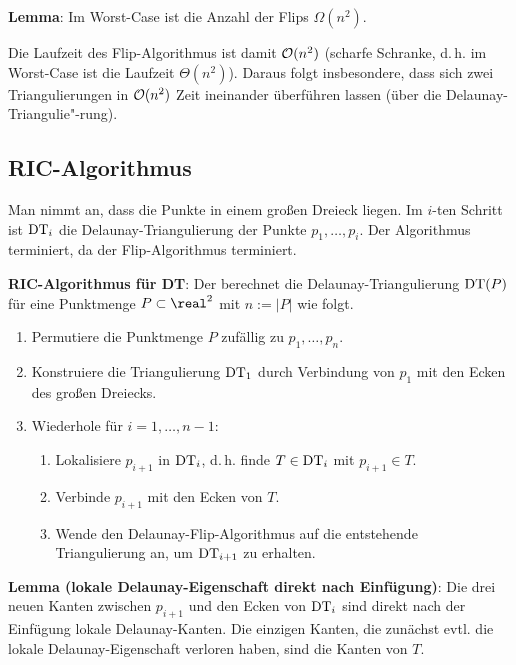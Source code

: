 \textbf{Lemma}:
Im Worst-Case ist die Anzahl der Flips $\Omega(n^2)$.

\linie

Die Laufzeit des Flip-Algorithmus ist damit $\mathcal{O}(n^2)$
(scharfe Schranke, d.\,h. im Worst-Case ist die Laufzeit $\Theta(n^2)$).
Daraus folgt insbesondere, dass sich zwei Triangulierungen in $\mathcal{O}(n^2)$ Zeit ineinander
überführen lassen (über die Delaunay-Triangulie"-rung).

\pagebreak

\subsection{%
    RIC-Algorithmus%
}

Man nimmt an, dass die Punkte in einem großen Dreieck liegen.
Im $i$-ten Schritt ist $\operatorname{DT}_i$
die Delaunay-Triangulierung der Punkte $p_1, \dotsc, p_i$.
Der Algorithmus terminiert, da der Flip-Algorithmus terminiert.

\textbf{RIC-Algorithmus für DT}:
Der  berechnet die Delaunay-Triangulierung $\operatorname{DT}(P)$
für eine Punktmenge $P \subset \real^2$ mit $n := |P|$ wie folgt.
\begin{enumerate}
    \item
    Permutiere die Punktmenge $P$ zufällig zu $p_1, \dotsc, p_n$.

    \item
    Konstruiere die Triangulierung $\operatorname{DT}_1$ durch Verbindung von $p_1$ mit den Ecken des
    großen Dreiecks.

    \item
    Wiederhole für $i = 1, \dotsc, n - 1$:
    \begin{enumerate}
        \item
        Lokalisiere $p_{i+1}$ in $\operatorname{DT}_i$, d.\,h. finde $T \in \operatorname{DT}_i$ mit $p_{i+1} \in T$.

        \item
        Verbinde $p_{i+1}$ mit den Ecken von $T$.

        \item
        Wende den Delaunay-Flip-Algorithmus auf die entstehende Triangulierung an,
        um $\operatorname{DT}_{i+1}$ zu erhalten.
    \end{enumerate}
\end{enumerate}

\linie

\textbf{Lemma (lokale Delaunay-Eigenschaft direkt nach Einfügung)}:
Die drei neuen Kanten zwischen $p_{i+1}$ und den Ecken von $\operatorname{DT}_i$
sind direkt nach der Einfügung lokale Delaunay-Kanten.
Die einzigen Kanten, die zunächst evtl. die lokale Delaunay-Eigenschaft verloren haben,
sind die Kanten von $T$.

